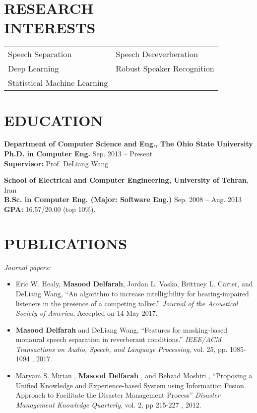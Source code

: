 \documentclass[margin, 10pt]{res}
\begin{document}
\begin{resume}

\section{RESEARCH\\INTERESTS}

\begin{tabular}{l l}
Speech Separation    & \hspace{0.3in}  Speech Dereverberation \\
Deep Learning    & \hspace{0.3in}   Robust Speaker Recognition \\
Statistical Machine Learning
\end{tabular}


\section{EDUCATION}

\textbf{Department of Computer Science and Eng., The Ohio State University }  \\
\textbf{Ph.D. in Computer Eng.} \hfill Sep. 2013 -- Present \\
\textbf{Supervisor:} Prof. DeLiang Wang

\textbf{School of Electrical and Computer Engineering, University of Tehran}, Iran\\
\textbf{B.Sc. in Computer Eng. (Major: Software Eng.)} \hfill Sep. 2008 -- Aug. 2013 \\
\textbf{GPA:} 16.57/20.00 (top 10\%).



\section{PUBLICATIONS}
\textit{Journal papers:}

\begin{itemize}
\item Eric W. Healy, \textbf{Masood Delfarah}, Jordan L. Vasko, Brittney L. Carter, and DeLiang Wang, ``An algorithm to increase intelligibility for hearing-impaired listeners in the presence of a competing talker.'' \textit{Journal of the Acoustical Society of America}, Accepted on 14 May 2017.
\item \textbf{Masood Delfarah} and DeLiang Wang, ``Features for masking-based monaural speech separation in reverberant conditions.'' \textit{IEEE/ACM Transactions on Audio, Speech, and Language Processing}, vol. 25, pp. 1085-1094 , 2017.
\item Maryam S. Mirian , \textbf{Masood Delfarah} , and Behzad Moshiri , ``Proposing a Unified Knowledge and Experience-based System using Information Fusion Approach to Facilitate the Disaster Management Process'' \textit{Disaster Management Knowledge Quarterly}, vol. 2, pp 215-227 , 2012. 
\end{itemize}


\end{resume}
\end{document}
